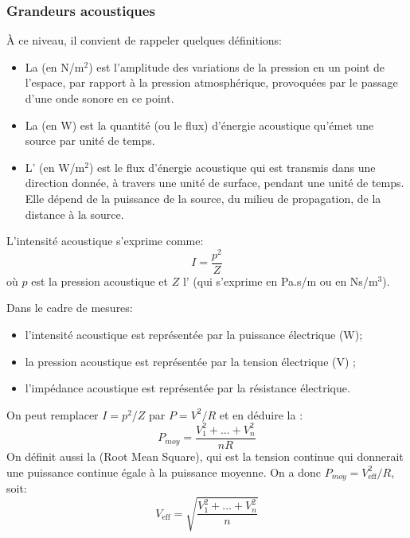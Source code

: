 \medskip
\subsubsection{Grandeurs acoustiques}

À ce niveau, il convient de rappeler quelques définitions:
\begin{itemize}
   \item La  (en N/m$^2$) est l'amplitude des variations de la pression en un point de l'espace, par rapport à la pression atmosphérique, provoquées par le passage d'une onde sonore en ce point. 
   \item La  (en W) est la quantité (ou le flux) d'énergie acoustique qu'émet une source par unité de temps.
   \item L' (en W/m$^2$) est le flux d'énergie acoustique qui est transmis dans une direction donnée, à travers une unité de surface, pendant une unité de temps. Elle dépend de la puissance de la source, du milieu de propagation, de la distance à la source.
\end{itemize}

\medskip
L'intensité acoustique s'exprime comme:
\begin{equation}
I = \frac{p^2}{Z}
\end{equation}
où $p$ est la pression acoustique et $Z$ l' (qui s'exprime en Pa.s/m ou en Ns/m$^3$).

\begin{remarque}
Dans le cadre de mesures:
\begin{itemize}
   \item l'intensité acoustique est représentée par la puissance électrique (W);
   \item la pression acoustique est représentée par la tension électrique (V) ;
   \item l'impédance acoustique est représentée par la résistance électrique.
\end{itemize}
On peut remplacer $I = p^2/Z$ par $P = V^2/R$ et en déduire la :
\begin{equation}
P_{moy}=\dfrac{V_1^2+...+V_n^2}{nR}
\end{equation}
On définit aussi la  (Root Mean Square), qui est la tension continue qui donnerait une puissance continue égale à la puissance moyenne. On a donc $P_{moy}=V_{\text{eff}}^2/R$, soit:
\begin{equation}
V_{\text{eff}}=\sqrt{\dfrac{V_1^2+...+V_n^2}{n}}
\end{equation}
\end{remarque}

